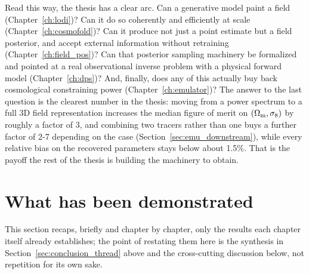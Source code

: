 Read this way, the thesis has a clear arc. Can a generative model paint a field (Chapter~\ref{ch:lodi})? Can it do so coherently and efficiently at scale (Chapter~\ref{ch:cosmofold})? Can it produce not just a point estimate but a field posterior, and accept external information without retraining (Chapter~\ref{ch:field_pos})? Can that posterior sampling machinery be formalized and pointed at a real observational inverse problem with a physical forward model (Chapter~\ref{ch:dps})? And, finally, does any of this actually buy back cosmological constraining power (Chapter~\ref{ch:emulator})? The answer to the last question is the clearest number in the thesis: moving from a power spectrum to a full 3D field representation increases the median figure of merit on $(\Omega_\mathrm{m},\sigma_8)$ by roughly a factor of 3, and combining two tracers rather than one buys a further factor of 2-7 depending on the case (Section~\ref{sec:emu_downstream}), while every relative bias on the recovered parameters stays below about 1.5\%. That is the payoff the rest of the thesis is building the machinery to obtain.

\section{What has been demonstrated}
\label{sec:conclusion_recap}

This section recaps, briefly and chapter by chapter, only the results each chapter itself already establishes; the point of restating them here is the synthesis in Section~\ref{sec:conclusion_thread} above and the cross-cutting discussion below, not repetition for its own sake.

